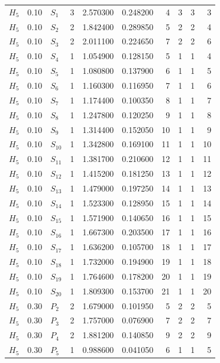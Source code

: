 \begin{longtable}{lrlrrrrrrr}
$H_5$ & 0.10 & $S_{1}$ & 3 & 2.570300 & 0.248200 & 4 & 3 & 3 & 3\\
$H_5$ & 0.10 & $S_{2}$ & 2 & 1.842400 & 0.289850 & 5 & 2 & 2 & 4\\
$H_5$ & 0.10 & $S_{3}$ & 2 & 2.011100 & 0.224650 & 7 & 2 & 2 & 6\\
$H_5$ & 0.10 & $S_{4}$ & 1 & 1.054900 & 0.128150 & 5 & 1 & 1 & 4\\
$H_5$ & 0.10 & $S_{5}$ & 1 & 1.080800 & 0.137900 & 6 & 1 & 1 & 5\\
$H_5$ & 0.10 & $S_{6}$ & 1 & 1.160300 & 0.116950 & 7 & 1 & 1 & 6\\
$H_5$ & 0.10 & $S_{7}$ & 1 & 1.174400 & 0.100350 & 8 & 1 & 1 & 7\\
$H_5$ & 0.10 & $S_{8}$ & 1 & 1.247800 & 0.120250 & 9 & 1 & 1 & 8\\
$H_5$ & 0.10 & $S_{9}$ & 1 & 1.314400 & 0.152050 & 10 & 1 & 1 & 9\\
$H_5$ & 0.10 & $S_{10}$ & 1 & 1.342800 & 0.169100 & 11 & 1 & 1 & 10\\
$H_5$ & 0.10 & $S_{11}$ & 1 & 1.381700 & 0.210600 & 12 & 1 & 1 & 11\\
$H_5$ & 0.10 & $S_{12}$ & 1 & 1.415200 & 0.181250 & 13 & 1 & 1 & 12\\
$H_5$ & 0.10 & $S_{13}$ & 1 & 1.479000 & 0.197250 & 14 & 1 & 1 & 13\\
$H_5$ & 0.10 & $S_{14}$ & 1 & 1.523300 & 0.128950 & 15 & 1 & 1 & 14\\
$H_5$ & 0.10 & $S_{15}$ & 1 & 1.571900 & 0.140650 & 16 & 1 & 1 & 15\\
$H_5$ & 0.10 & $S_{16}$ & 1 & 1.667300 & 0.203500 & 17 & 1 & 1 & 16\\
$H_5$ & 0.10 & $S_{17}$ & 1 & 1.636200 & 0.105700 & 18 & 1 & 1 & 17\\
$H_5$ & 0.10 & $S_{18}$ & 1 & 1.732000 & 0.194900 & 19 & 1 & 1 & 18\\
$H_5$ & 0.10 & $S_{19}$ & 1 & 1.764600 & 0.178200 & 20 & 1 & 1 & 19\\
$H_5$ & 0.10 & $S_{20}$ & 1 & 1.809300 & 0.153700 & 21 & 1 & 1 & 20\\
$H_5$ & 0.30 & $P_{2}$ & 2 & 1.679000 & 0.101950 & 5 & 2 & 2 & 5\\
$H_5$ & 0.30 & $P_{3}$ & 2 & 1.757000 & 0.076900 & 7 & 2 & 2 & 7\\
$H_5$ & 0.30 & $P_{4}$ & 2 & 1.881200 & 0.140850 & 9 & 2 & 2 & 9\\
$H_5$ & 0.30 & $P_{5}$ & 1 & 0.988600 & 0.041050 & 6 & 1 & 1 & 5\\

\end{longtable}
